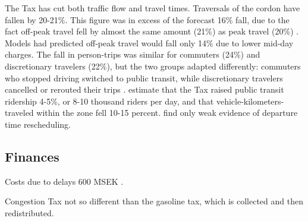The Tax has cut both traffic flow and travel times. Traversals of the cordon have fallen by 20-21\%. This figure was in excess of the forecast 16\% fall, due to the fact off-peak travel fell by almost the same amount (21\%) as peak travel (20\%) \citep{Eliasson2013}. Models had predicted off-peak travel would fall only 14\% due to lower mid-day charges. The fall in person-trips was similar for commuters (24\%) and discretionary travelers (22\%), but the two groups adapted differently: commuters who stopped driving switched to public transit, while discretionary travelers cancelled or rerouted their trips \citep{FranklinEtAl2010}. \citet{Eliasson2013} estimate that the Tax raised public transit ridership 4-5\%, or 8-10 thousand riders per day, and that vehicle-kilometers-traveled within the zone fell 10-15 percent. \citet{Karlstrom2009} find only weak evidence of departure time rescheduling.

\subsection{Finances}
Costs due to delays 600 MSEK \citet[p. 843]{GullbergIsaksson2009}.

Congestion Tax not so different than the gasoline tax, which is collected and then redistributed.
